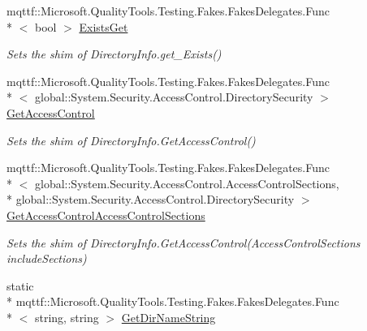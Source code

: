 \begin{DoxyCompactItemize}
mqttf\-::\-Microsoft.\-Quality\-Tools.\-Testing.\-Fakes.\-Fakes\-Delegates.\-Func\\*
$<$ bool $>$ \hyperlink{class_system_1_1_i_o_1_1_fakes_1_1_shim_directory_info_ae82ab47403ebab11ec40bcaefac74dbd}{Exists\-Get}
\begin{DoxyCompactList}\small\item\em Sets the shim of Directory\-Info.\-get\-\_\-\-Exists()\end{DoxyCompactList}\item 
mqttf\-::\-Microsoft.\-Quality\-Tools.\-Testing.\-Fakes.\-Fakes\-Delegates.\-Func\\*
$<$ global\-::\-System.\-Security.\-Access\-Control.\-Directory\-Security $>$ \hyperlink{class_system_1_1_i_o_1_1_fakes_1_1_shim_directory_info_aa411d3d2ad8cf4b51aeca0dd475ba9b6}{Get\-Access\-Control}
\begin{DoxyCompactList}\small\item\em Sets the shim of Directory\-Info.\-Get\-Access\-Control()\end{DoxyCompactList}\item 
mqttf\-::\-Microsoft.\-Quality\-Tools.\-Testing.\-Fakes.\-Fakes\-Delegates.\-Func\\*
$<$ global\-::\-System.\-Security.\-Access\-Control.\-Access\-Control\-Sections, \\*
global\-::\-System.\-Security.\-Access\-Control.\-Directory\-Security $>$ \hyperlink{class_system_1_1_i_o_1_1_fakes_1_1_shim_directory_info_a0b2658fb648a752f7631d33967ad4c04}{Get\-Access\-Control\-Access\-Control\-Sections}
\begin{DoxyCompactList}\small\item\em Sets the shim of Directory\-Info.\-Get\-Access\-Control(\-Access\-Control\-Sections include\-Sections)\end{DoxyCompactList}\item 
static \\*
mqttf\-::\-Microsoft.\-Quality\-Tools.\-Testing.\-Fakes.\-Fakes\-Delegates.\-Func\\*
$<$ string, string $>$ \hyperlink{class_system_1_1_i_o_1_1_fakes_1_1_shim_directory_info_a80861d9d00b3d033445b9d7734c22f8e}{Get\-Dir\-Name\-String}

\end{DoxyCompactItemize}
